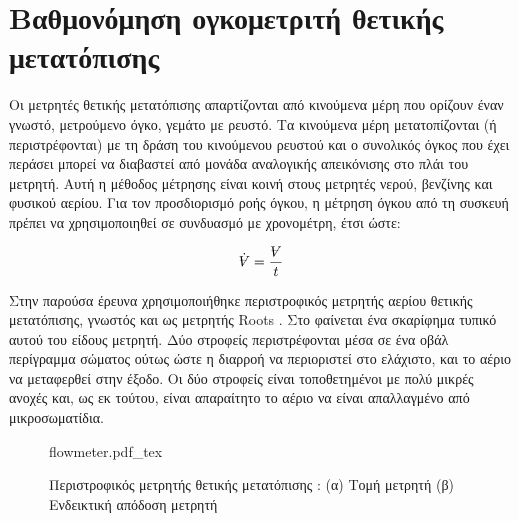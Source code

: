 \chapter[Βαθμονόμηση μετρητή παροχής]{Βαθμονόμηση ογκομετριτή θετικής μετατόπισης}\label{app:calibration}




\begin{refsection}

\noindent Οι μετρητές θετικής μετατόπισης απαρτίζονται από κινούμενα μέρη που ορίζουν έναν γνωστό, μετρούμενο όγκο, γεμάτο με ρευστό. Τα κινούμενα μέρη μετατοπίζονται (ή περιστρέφονται) με τη δράση του κινούμενου ρευστού και ο συνολικός όγκος που έχει περάσει μπορεί να διαβαστεί από μονάδα αναλογικής απεικόνισης στο πλάι του μετρητή. Αυτή η μέθοδος μέτρησης είναι κοινή στους μετρητές νερού, βενζίνης και φυσικού αερίου. Για τον προσδιορισμό ροής όγκου, η μέτρηση όγκου από τη συσκευή πρέπει να χρησιμοποιηθεί σε συνδυασμό με χρονομέτρη, έτσι ώστε:

\begin{align}\label{eq:vol}
\dot{\volume} = \frac{\volume}{t}
\end{align}
 
\noindent Στην παρούσα έρευνα χρησιμοποιήθηκε περιστροφικός μετρητής αερίου θετικής μετατόπισης, γνωστός και ως μετρητής Roots \cite{2000_Baker_BOOK_CHAPTER}. Στο  φαίνεται ένα σκαρίφημα τυπικό αυτού του είδους μετρητή. Δύο στροφείς περιστρέφονται μέσα σε ένα οβάλ περίγραμμα σώματος ούτως ώστε η διαρροή να περιοριστεί στο ελάχιστο, και το αέριο να μεταφερθεί στην έξοδο. Οι δύο στροφείς είναι τοποθετημένοι με πολύ μικρές ανοχές και, ως εκ τούτου, είναι απαραίτητο το αέριο να είναι απαλλαγμένο από μικροσωματίδια.

\begin{figure} 
\centering    
{flowmeter.pdf_tex}
\caption{Περιστροφικός μετρητής θετικής μετατόπισης \cite{2000_Baker_BOOK_CHAPTER}: (α) Τομή μετρητή (β) Ενδεικτική απόδοση μετρητή}
\label{fig:flowmet}
\end{figure}


\end{refsection}
